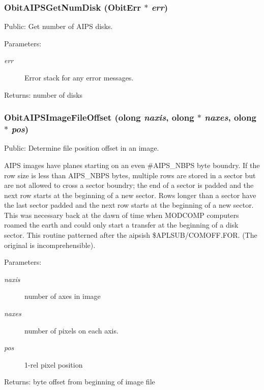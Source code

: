 \subsubsection{ Obit\-AIPSGet\-Num\-Disk ({\bf Obit\-Err} $\ast$ {\em err})}\label{ObitAIPS_8h_a17}


Public: Get number of AIPS disks. 

\begin{Desc}
\item[Parameters:]
\begin{description}
\item[{\em err}]Error stack for any error messages. \end{description}
\end{Desc}
\begin{Desc}
\item[Returns:]number of disks \end{Desc}
\subsubsection{ Obit\-AIPSImage\-File\-Offset ({\bf olong} {\em naxis}, {\bf olong} $\ast$ {\em naxes}, {\bf olong} $\ast$ {\em pos})}\label{ObitAIPS_8h_a18}


Public: Determine file position offset in an image. 

AIPS images have planes starting on an even \#AIPS\_\-NBPS byte boundry. If the row size is less than AIPS\_\-NBPS bytes, multiple rows are stored in a sector but are not allowed to cross a sector boundry; the end of a sector is padded and the next row starts at the beginning of a new sector. Rows longer than a sector have the last sector padded and the next row starts at the beginning of a new sector. This was necessary back at the dawn of time when MODCOMP computers roamed the earth and could only start a transfer at the beginning of a disk sector. This routine patterned after the aipsish \$APLSUB/COMOFF.FOR. (The original is incomprehensible). \begin{Desc}
\item[Parameters:]
\begin{description}
\item[{\em naxis}]number of axes in image \item[{\em naxes}]number of pixels on each axis. \item[{\em pos}]1-rel pixel position \end{description}
\end{Desc}
\begin{Desc}
\item[Returns:]byte offset from beginning of image file \end{Desc}
